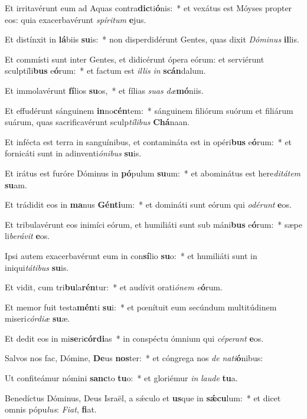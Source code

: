 \item Et irritavérunt eum ad Aquas contra\textbf{dic}ti\textbf{ó}nis:~* et vexátus est Móyses propter eos: quia exacerbavérunt \textit{spí}\textit{ri}\textit{tum} \textbf{e}jus.
\item Et distínxit in \textbf{lá}biis \textbf{su}is:~* non disperdidérunt Gentes, quas dixit \textit{Dó}\textit{mi}\textit{nus} \textbf{il}lis.
\item Et commísti sunt inter Gentes, et didicérunt ópera eórum: et serviérunt sculptíli\textbf{bus} e\textbf{ó}rum:~* et factum est \textit{il}\textit{lis} \textit{in} \textbf{scán}dalum.
\item Et immolavérunt \textbf{fí}lios \textbf{su}os,~* et fílias \textit{su}\textit{as} \textit{dæ}\textbf{mó}niis.
\item Et effudérunt sánguinem \textbf{in}no\textbf{cén}tem:~* sánguinem filiórum suórum et filiárum suárum, quas sacrificavérunt sculp\textit{tí}\textit{li}\textit{bus} \textbf{Chá}naan.
\item Et infécta est terra in sanguínibus, et contamináta est in opéri\textbf{bus} e\textbf{ó}rum:~* et fornicáti sunt in adinventi\textit{ó}\textit{ni}\textit{bus} \textbf{su}is.
\item Et irátus est furóre Dóminus in \textbf{pó}pulum \textbf{su}um:~* et abominátus est here\textit{di}\textit{tá}\textit{tem} \textbf{su}am.
\item Et trádidit eos in \textbf{ma}nus \textbf{Gén}\textbf{ti}um:~* et domináti sunt eórum qui \textit{o}\textit{dé}\textit{runt} \textbf{e}os.
\item Et tribulavérunt eos inimíci eórum, et humiliáti sunt sub máni\textbf{bus} e\textbf{ó}rum:~* sæpe li\textit{be}\textit{rá}\textit{vit} \textbf{e}os.
\item Ipsi autem exacerbavérunt eum in con\textbf{sí}lio \textbf{su}o:~* et humiliáti sunt in iniqui\textit{tá}\textit{ti}\textit{bus} \textbf{su}is.
\item Et vidit, cum tri\textbf{bu}la\textbf{rén}tur:~* et audívit orati\textit{ó}\textit{nem} \textit{e}\textbf{ó}rum.
\item Et memor fuit testa\textbf{mén}ti \textbf{su}i:~* et pœnítuit eum secúndum multitúdinem miseri\textit{cór}\textit{di}\textit{æ} \textbf{su}æ.
\item Et dedit eos in mi\textbf{se}ri\textbf{cór}\textbf{di}as~* in conspéctu ómnium qui \textit{cé}\textit{pe}\textit{rant} \textbf{e}os.
\item Salvos nos fac, Dómine, \textbf{De}us \textbf{nos}ter:~* et cóngrega nos \textit{de} \textit{na}\textit{ti}\textbf{ó}nibus:
\item Ut confiteámur nómini \textbf{sanc}to \textbf{tu}o:~* et gloriémur \textit{in} \textit{lau}\textit{de} \textbf{tu}a.
\item Benedíctus Dóminus, Deus Israël, a sǽculo et \textbf{us}que in \textbf{sǽ}\textbf{cu}lum:~* et dicet omnis pópu\textit{lus}: \textit{Fi}\textit{at}, \textbf{fi}at.
